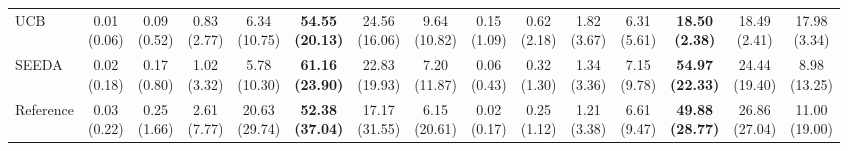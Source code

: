 {\begin{tabular}{l|ccccccc|ccccccc}
UCB & \makecell{0.01 \\ (0.06)} & \makecell{0.09 \\ (0.52)} & \makecell{0.83 \\ (2.77)} & \makecell{6.34 \\ (10.75)} & \cellcolor[HTML]{C8E6C9}\bfseries \makecell{54.55 \\ (20.13)} & \makecell{24.56 \\ (16.06)} & \makecell{9.64 \\ (10.82)} & \makecell{0.15 \\ (1.09)} & \makecell{0.62 \\ (2.18)} & \makecell{1.82 \\ (3.67)} & \makecell{6.31 \\ (5.61)} & \cellcolor[HTML]{C8E6C9}\bfseries \makecell{18.50 \\ (2.38)} & \makecell{18.49 \\ (2.41)} & \makecell{17.98 \\ (3.34)} \\
SEEDA & \makecell{0.02 \\ (0.18)} & \makecell{0.17 \\ (0.80)} & \makecell{1.02 \\ (3.32)} & \makecell{5.78 \\ (10.30)} & \cellcolor[HTML]{C8E6C9}\bfseries \makecell{61.16 \\ (23.90)} & \makecell{22.83 \\ (19.93)} & \makecell{7.20 \\ (11.87)} & \makecell{0.06 \\ (0.43)} & \makecell{0.32 \\ (1.30)} & \makecell{1.34 \\ (3.36)} & \makecell{7.15 \\ (9.78)} & \cellcolor[HTML]{C8E6C9}\bfseries \makecell{54.97 \\ (22.33)} & \makecell{24.44 \\ (19.40)} & \makecell{8.98 \\ (13.25)} \\
Reference & \makecell{0.03 \\ (0.22)} & \makecell{0.25 \\ (1.66)} & \makecell{2.61 \\ (7.77)} & \makecell{20.63 \\ (29.74)} & \cellcolor[HTML]{C8E6C9}\bfseries \makecell{52.38 \\ (37.04)} & \makecell{17.17 \\ (31.55)} & \makecell{6.15 \\ (20.61)} & \makecell{0.02 \\ (0.17)} & \makecell{0.25 \\ (1.12)} & \makecell{1.21 \\ (3.38)} & \makecell{6.61 \\ (9.47)} & \cellcolor[HTML]{C8E6C9}\bfseries \makecell{49.88 \\ (28.77)} & \makecell{26.86 \\ (27.04)} & \makecell{11.00 \\ (19.00)} \\

\end{tabular}}

